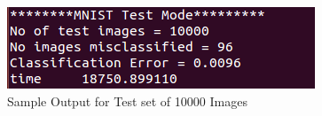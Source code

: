 \begin{figure}[!h]
\centering
\includegraphics[scale=0.65]{figures/sample_output.png}
\caption{Sample Output for Test set of 10000 Images}
\label{fig:output_mnist}
\end{figure}